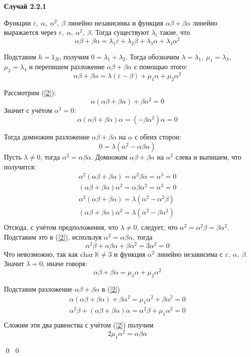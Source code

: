 \documentclass[12pt, reqno, a4paper, oneside, notitlepage]{amsart}
\makeatletter
\theoremstyle{mytheoremstyle}
\theoremstyle{myremarkstyle}
\numberwithin{equation}{section}
\renewenvironment{proof}[1][\proofname]{\par\indent {\bfseries #1\@addpunct{.} }}{\qed}
\makeatother
\begin{document}
\begin{proof}
\begin{proof}
    \textbf{Случай 2.2.1}

    Функции $\varepsilon,\ \alpha,\ \alpha^2,\ \beta$ линейно независимы и функция $\alpha\beta+\beta\alpha$ линейно выражается через $\varepsilon,\ \alpha,\ \alpha^2,\ \beta$.
    Тогда существуют $\lambda_i$ такие, что \[
    \alpha\beta+\beta\alpha = \lambda_1\varepsilon+\lambda_2\beta +\lambda_3\alpha+\lambda_4\alpha^2
     \]

    Подставим $h = 1_H$, получим $0 = \lambda_1+\lambda_2$. Тогда обозначим $\lambda = \lambda_1,\ {\mu_1 = \lambda_3,}$ ${\mu_2 = \lambda_4}$ и перепишем разложение $\alpha\beta+\beta\alpha$ с помощью этого: \[
    \alpha\beta+\beta\alpha = \lambda(\varepsilon-\beta)+\mu_1\alpha+\mu_2\alpha^2
    \]

    Рассмотрим (\ref{2}): 
    \[
    \alpha(\alpha\beta+\beta\alpha)+\beta\alpha^2 = 0
    \]
    Значит с учётом $\alpha^3 =0$: \[
    \alpha(\alpha\beta+\beta\alpha)\alpha = (-\beta\alpha^2)\alpha = 0
    \]

    Тогда домножим разложение $\alpha\beta+\beta\alpha$ на $\alpha$ с обеих сторон:\[
    0 = \lambda(\alpha^2-\alpha\beta\alpha)
    \]
    Пусть $\lambda \neq 0$, тогда $\alpha^2 = \alpha\beta\alpha$. Домножим $\alpha\beta+\beta\alpha$ на $\alpha^2$ слева и выпишем, что получится:
    \begin{eqnarray*}
        \alpha^2(\alpha\beta+\beta\alpha) = \alpha^2\beta\alpha= \alpha^3 = 0\\
        (\alpha\beta+\beta\alpha)\alpha^2= \alpha\beta\alpha^2 = \alpha^3 = 0\\
        \alpha^2(\alpha\beta+\beta\alpha) = \lambda(\alpha^2 - \alpha^2\beta)\\
        (\alpha\beta+\beta\alpha)\alpha^2 = \lambda(\alpha^2 - \beta\alpha^2)\\
    \end{eqnarray*}
    Отсюда, с учётом предположения, что $\lambda\neq 0$, следует, что $\alpha^2 = \alpha^2\beta= \beta\alpha^2$. Подставим это в (\ref{2}), используя $\alpha^2 = \alpha\beta\alpha$, тогда
    \[
        \alpha^2\beta+\alpha\beta\alpha+\beta\alpha^2 = 3\alpha^2=0
    \]
    Что невозможно, так как $\mathrm{char}\ \mathbb{K} \neq 3$ и функция $\alpha^2$ линейно независима с $\varepsilon,\ \alpha,\ \beta$. Значит $\lambda = 0$, иначе говоря: \[
    \alpha\beta+\beta\alpha = \mu_1\alpha+\mu_2\alpha^2
    \]

    Подставим разложение $\alpha\beta+\beta\alpha$ в (\ref{2})
    \begin{eqnarray*}
        \alpha(\alpha\beta+\beta\alpha)+\beta\alpha^2 = \mu_1\alpha^2 + \beta\alpha^2 = 0\\
        \alpha^2\beta+(\alpha\beta+\beta\alpha)\alpha = \alpha^2\beta + \mu_1\alpha^2 = 0\\
    \end{eqnarray*}
    Сложим эти два равенства с учётом (\ref{2}) получим \[
    2\mu_1\alpha^2 = \alpha\beta\alpha
    \]
    

\end{proof}
\end{proof}
\end{document}
